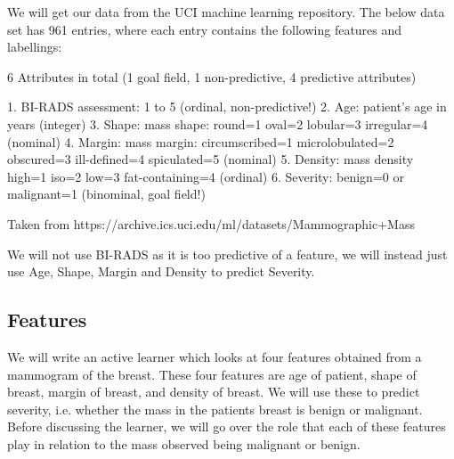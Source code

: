 \documentclass[12pt]{article}
\begin{document}
We will get our data from the UCI machine learning repository. The below data set has 961 entries, where each entry contains the following features and labellings: 

6 Attributes in total (1 goal field, 1 non-predictive, 4 predictive attributes) 

1. BI-RADS assessment: 1 to 5 (ordinal, non-predictive!) 
2. Age: patient's age in years (integer) 
3. Shape: mass shape: round=1 oval=2 lobular=3 irregular=4 (nominal) 
4. Margin: mass margin: circumscribed=1 microlobulated=2 obscured=3 ill-defined=4 spiculated=5 (nominal) 
5. Density: mass density high=1 iso=2 low=3 fat-containing=4 (ordinal) 
6. Severity: benign=0 or malignant=1 (binominal, goal field!) 

Taken from https://archive.ics.uci.edu/ml/datasets/Mammographic+Mass 

We will not use BI-RADS as it is too predictive of a feature, we will instead just use Age, Shape, Margin and Density to predict Severity.

\subsection{Features}

We will write an active learner which looks at four features obtained from a mammogram of the breast. These four features are age of patient, shape of breast, margin of breast, and density of breast. We will use these to predict severity, i.e. whether the mass in the patients breast is benign or malignant. Before discussing the learner, we will go over the role that each of these features play in relation to the mass observed being malignant or benign.
\end{document}
